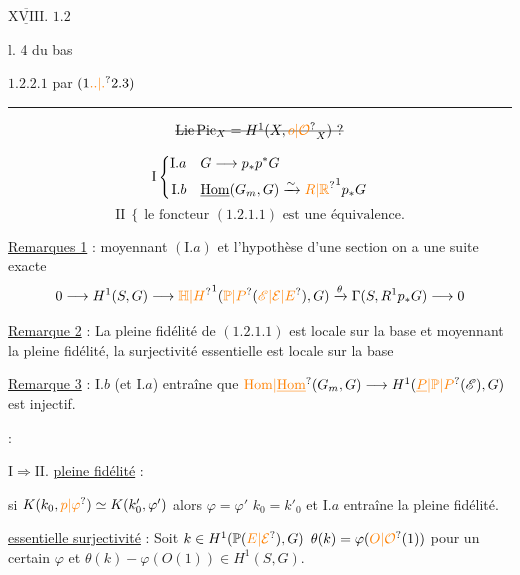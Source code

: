 
$\underline{\overline{\mathrm{XVIII}}}$. $1.2$



 l. 4 du bas

 $1.2.2.1$ par $(1\unsure{..|.}2.3)$

\smallskip\noindent\rule{.44\linewidth}{.35pt}

\[
\deleted{\mathrm{Lie}\,\mathrm{Pic}_{X}=H^{1}(X,\unsure{o|\mathcal O}_{X})\ ?}
\]



\[
\mathrm I\left\{\begin{aligned}
\mathrm I.a\quad & G\longrightarrow p_*p^*G\\
\mathrm I.b\quad & \underline{\mathrm{Hom}}(G_m,G)\xrightarrow{\sim}{\unsure{R|\mathbb R}}^1p_*G
\end{aligned}\right.
\]
\[
\mathrm{II}\ \left\{\ \text{le foncteur $(1.2.1.1)$ est une équivalence.}\right.
\]

\uline{Remarques 1} :  moyennant $(\mathrm I.a)$ et l'hypothèse d'une section
on a une suite exacte
\[
0\longrightarrow H^1(S,G)\longrightarrow {\unsure{\mathbb H|H}}^{1}(\unsure{\mathbb P|P}(\unsure{\mathscr E|\mathcal E|E}),G)
\xrightarrow{\theta}\Gamma(S,R^1p_*G)\longrightarrow0
\]

\uline{Remarque 2} : La pleine fidélité de $(1.2.1.1)$ est locale sur la base et
moyennant la pleine fidélité, la surjectivité essentielle est locale sur la base

\uline{Remarque 3} : $\mathrm I.b$ (et $\mathrm I.a$) entraîne que
$\unsure{\mathrm{Hom}|\underline{\mathrm{Hom}}}(G_m,G)\longrightarrow H^1(\unsure{\underline{P}|\mathbb P|P}(\mathscr E),G)$ est injectif.

 :


$\mathrm I\Rightarrow\mathrm{II}$. \uline{pleine fidélité} :

si $K(k_0,\unsure{p|\varphi})\simeq K(k'_0,\varphi')$ alors $\varphi=\varphi'$
 $k_0=k'_0$ et $\mathrm I.a$ entraîne la pleine fidélité.

\uline{essentielle surjectivité} : Soit $k\in H^1(\mathbb P(\unsure{E|\mathcal E}),G)$
$\theta(k)=\varphi(\unsure{O|\mathcal O}(1))$ pour un certain $\varphi$ et
$\theta(k)-\varphi(O(1))\in H^1(S,G)$.

